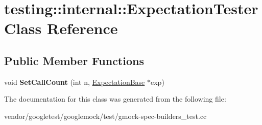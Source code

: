 \hypertarget{classtesting_1_1internal_1_1_expectation_tester}{}\section{testing\+:\+:internal\+:\+:Expectation\+Tester Class Reference}
\label{classtesting_1_1internal_1_1_expectation_tester}
\subsection*{Public Member Functions}
\begin{DoxyCompactItemize}
\item 
\mbox{\label{classtesting_1_1internal_1_1_expectation_tester_af5d762355ef83f414c4b0fc14c8fc943}} 
void {\bfseries Set\+Call\+Count} (int n, \hyperlink{classtesting_1_1internal_1_1_expectation_base}{Expectation\+Base} $\ast$exp)
\end{DoxyCompactItemize}


The documentation for this class was generated from the following file\+:\begin{DoxyCompactItemize}
\item 
vendor/googletest/googlemock/test/gmock-\/spec-\/builders\+\_\+test.\+cc\end{DoxyCompactItemize}
